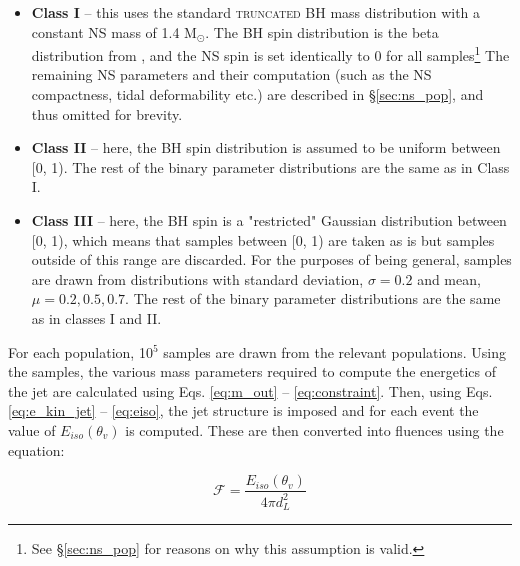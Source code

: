     \begin{itemize}

        \item \textbf{Class I} -- this uses the standard \textsc{truncated} BH mass
            distribution with a constant NS mass of 1.4 M$_\odot$. The BH spin
            distribution is the beta distribution from \cite{abbott_2020B}, and the NS
            spin is set identically to 0 for all samples\footnote
            {
                See \S\ref{sec:ns_pop} for reasons on why this assumption is valid.
            }
            The remaining NS parameters and their computation (such as the NS
            compactness, tidal deformability etc.) are described in \S\ref{sec:ns_pop},
            and thus omitted for brevity.

        \item \textbf{Class II} -- here, the BH spin distribution is assumed to be
            uniform between [0, 1). The rest of the binary parameter distributions are
            the same as in Class I.

        \item \textbf{Class III} -- here, the BH spin is a "restricted" Gaussian
            distribution between [0, 1), which means that samples between [0, 1) are
            taken as is but samples outside of this range are discarded.  For the
            purposes of being general, samples are drawn from distributions with
            standard deviation, $\sigma = 0.2$ and mean, $\mu = 0.2, 0.5, 0.7$.  The
            rest of the binary parameter distributions are the same as in classes I and
            II.

    \end{itemize}

    For each population, 10$^5$ samples are drawn from the relevant populations. Using
    the samples, the various mass parameters required to compute the energetics of the
    jet are calculated using Eqs. \ref{eq:m_out} -- \ref{eq:constraint}. Then, using
    Eqs.  \ref{eq:e_kin_jet} -- \ref{eq:eiso}, the jet structure is imposed and for each
    event the value of $E_{iso}(\theta_v)$ is computed. These are then converted into
    fluences using the equation:

    \begin{equation}
        \mathcal{F} = \dfrac{E_{iso}(\theta_v)}{4\pi d_L^2}
        \label{eq:fluence}
    \end{equation}

